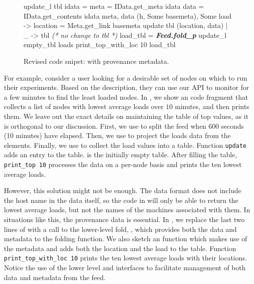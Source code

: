 \begin{figure}[tb]

\begin{codebox}
 update_l tbl idata =
   meta = IData.get_meta idata 
   data = IData.get_contents idata 
   meta, data  
    (h, Some basemeta), Some load ->
       location = Meta.get_link basemeta 
      update tbl (location, data)
  | _ -> tbl \textit{ (* no change to tbl *)} 
 load_tbl = \textit{\textbf{Feed.fold_p}} update_l empty_tbl loads
 print_top_with_loc 10 load_tbl
\end{codebox}
  \caption{Revised code snipet: with provenance metadata. }
\label{fig:sample-loads-prov}
\end{figure}

For example, consider a \planetlab user looking for a desirable set of
nodes on which to run their experiments. Based on the \comon
description, they can use our API to monitor \planetlab for a few
minutes to find the least loaded nodes. In ,
we show an \ocaml code fragment that collects a list of nodes with
lowest average loads over $10$ minutes, and then prints them. We leave
out the exact details on maintaining the table of top values, as it is
orthogonal to our discussion. First, we use  to
split the feed when 600 seconds (10 minutes) have elapsed. Then, we
use  to project the loads data from the\comon
elements. Finally, we use  to collect the load values
into a table. Function \texttt{update} adds an entry to the table.
 is the initially empty table.
After filling the table, \texttt{print\_top 10}
processes the data on a per-node basis
and prints the ten lowest average loads.

However, this solution might not be enough. The \comon data format
does not include the host name in the data itself, so the code in
 will only be able to return the lowest
average loads, but not the names of the machines associated with
them. In situations like this, the provenance data is essential.  In
, we replace the last two lines of
 with a call to the lower-level fold,
, which provides both the data and metadata to the folding
function. We also sketch an  function which makes use of 
the metadata and adds both the location and the load to the table. 
Function \texttt{print\_top\_with\_loc 10} prints the ten lowest average loads
with their locations.
Notice the use of the lower level  and
 interfaces to facilitate management of both data and 
metadata from the feed. 

